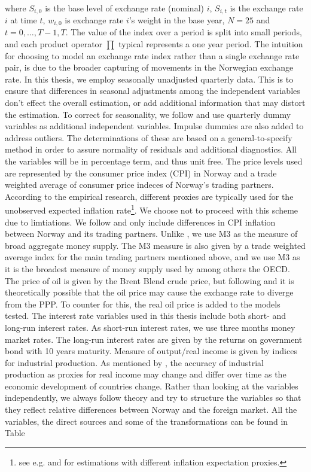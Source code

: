\documentclass[10pt]{article}
\numberwithin{equation}{section}
\numberwithin{table}{section}
\numberwithin{figure}{section}
\begin{document}
\begin{spacing}{1.5}
\begin{align}
\end{align}
\noindent where $S_{i,0}$ is the base level of exchange rate (nominal) $i$, $S_{i,t}$ is the exchange rate $i$ at time $t$, $w_{i,0}$ is exchange rate $i$'s weight in the base year, $N = 25$ and $t=0,\hdots,T-1, T$. The value of the index over a period is split into small periods, and each product operator $\prod$ typical represents a one year period. The intuition for choosing to model an exchange rate index rather than a single exchange rate pair, is due to the broader capturing of movements in the Norwegian exchange rate. In this thesis, we employ seasonally unadjusted quarterly data. This is to ensure that differences in seasonal adjustments among the independent variables don't effect the overall estimation, or add additional information that may distort the estimation. To correct for seasonality, we follow \cite{reinton1999out} and use quarterly dummy variables as additional independent variables. Impulse dummies are also added to address outliers. The determinations of these are based on a general-to-specify method in order to assure normality of residuals and additional diagnostics. All the variables will be in percentage term, and thus unit free. The price levels used are represented by the consumer price index (CPI) in Norway and a trade weighted average of consumer price indeces of Norway's trading partners. According to the empirical research, different proxies are typically used for the unobserved expected inflation rate\footnote{see e.g. \cite{reinton1999out} and \cite{papadamou2012monetary} for estimations with different inflation expectation proxies.}. We choose not to proceed with this scheme due to limtiations. We follow \cite{akram2000does,akram2004oil} and only include differences in CPI inflation between Norway and its trading partners. Unlike \cite{meese1983out,meese1983empirical}, we use M3 as the measure of broad aggregate money supply. The M3 measure is also given by a trade weighted average index for the main trading partners mentioned above, and we use M3 as it is the broadest measure of money supply used by among others the OECD. The price of oil is given by the Brent Blend crude price, but following \cite{bjornland2005commodity} and \cite{papadamou2012monetary} it is theoretically possible that the oil price may cause the exchange rate to diverge from the PPP. To counter for this, the real oil price is added to the models tested. The interest rate variables used in this thesis include both short- and long-run interest rates. As short-run interest rates, we use three months money market rates. The long-run interest rates are given by the returns on government bond with 10 years maturity. Measure of output/real income is given by indices for industrial production. As mentioned by \cite{reinton1999out}, the accuracy of industrial production as proxies for real income may change and differ over time as the economic development of countries change. Rather than looking at the variables independently, we always follow theory and try to structure the variables so that they reflect relative differences between Norway and the foreign market. All the variables, the direct sources and some of the transformations can be found in Table 
\end{spacing}
\end{document}
